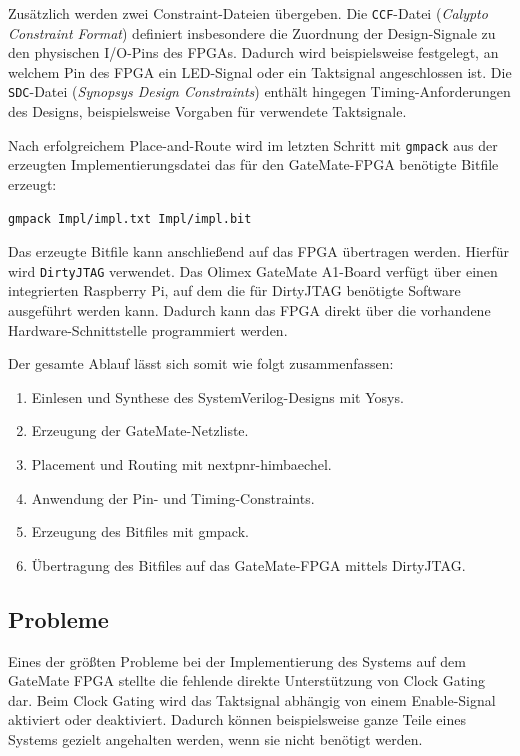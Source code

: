 \documentclass[a4paper,11pt]{article}
\begin{document}
Zusätzlich werden zwei Constraint-Dateien übergeben. Die \texttt{CCF}-Datei (\textit{Calypto Constraint Format}) definiert insbesondere die Zuordnung der Design-Signale zu den physischen I/O-Pins des FPGAs. Dadurch wird beispielsweise festgelegt, an welchem Pin des FPGA ein LED-Signal oder ein Taktsignal angeschlossen ist. Die \texttt{SDC}-Datei (\textit{Synopsys Design Constraints}) enthält hingegen Timing-Anforderungen des Designs, beispielsweise Vorgaben für verwendete Taktsignale.

Nach erfolgreichem Place-and-Route wird im letzten Schritt mit \texttt{gmpack} aus der erzeugten Implementierungsdatei das für den GateMate-FPGA benötigte Bitfile erzeugt:

\begin{verbatim}
gmpack Impl/impl.txt Impl/impl.bit
\end{verbatim}

Das erzeugte Bitfile kann anschließend auf das FPGA übertragen werden. Hierfür wird \texttt{DirtyJTAG} verwendet. Das Olimex GateMate A1-Board verfügt über einen integrierten Raspberry Pi, auf dem die für DirtyJTAG benötigte Software ausgeführt werden kann. Dadurch kann das FPGA direkt über die vorhandene Hardware-Schnittstelle programmiert werden.

Der gesamte Ablauf lässt sich somit wie folgt zusammenfassen:
\newpage
\begin{enumerate}
	\item Einlesen und Synthese des SystemVerilog-Designs mit Yosys.
	\item Erzeugung der GateMate-Netzliste.
	\item Placement und Routing mit nextpnr-himbaechel.
	\item Anwendung der Pin- und Timing-Constraints.
	\item Erzeugung des Bitfiles mit gmpack.
	\item Übertragung des Bitfiles auf das GateMate-FPGA mittels DirtyJTAG.
\end{enumerate}

\subsection{Probleme}

Eines der größten Probleme bei der Implementierung des Systems auf dem GateMate FPGA stellte die fehlende direkte Unterstützung von Clock Gating dar. Beim Clock Gating wird das Taktsignal abhängig von einem Enable-Signal aktiviert oder deaktiviert. Dadurch können beispielsweise ganze Teile eines Systems gezielt angehalten werden, wenn sie nicht benötigt werden.
\end{document}
